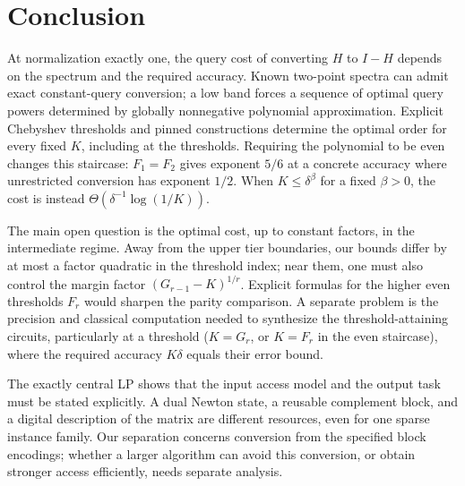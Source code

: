 \section{Conclusion}\label{sec:conclusion}
At normalization exactly one, the query cost of converting $H$ to $I-H$ depends on the spectrum and the required accuracy. Known two-point spectra can admit exact constant-query conversion; a low band forces a sequence of optimal query powers determined by globally nonnegative polynomial approximation. Explicit Chebyshev thresholds and pinned constructions determine the optimal order for every fixed $K$, including at the thresholds. Requiring the polynomial to be even changes this staircase: $F_1=F_2$ gives exponent $5/6$ at a concrete accuracy where unrestricted conversion has exponent $1/2$. When $K\leq\delta^\beta$ for a fixed $\beta>0$, the cost is instead $\Theta(\delta^{-1}\log(1/K))$.

The main open question is the optimal cost, up to constant factors, in the intermediate regime. Away from the upper tier boundaries, our bounds differ by at most a factor quadratic in the threshold index; near them, one must also control the margin factor $(G_{r-1}-K)^{1/r}$. Explicit formulas for the higher even thresholds $F_r$ would sharpen the parity comparison. A separate problem is the precision and classical computation needed to synthesize the threshold-attaining circuits, particularly at a threshold ($K=G_r$, or $K=F_r$ in the even staircase), where the required accuracy $K\delta$ equals their error bound.

The exactly central LP shows that the input access model and the output task must be stated explicitly. A dual Newton state, a reusable complement block, and a digital description of the matrix are different resources, even for one sparse instance family. Our separation concerns conversion from the specified block encodings; whether a larger algorithm can avoid this conversion, or obtain stronger access efficiently, needs separate analysis.
